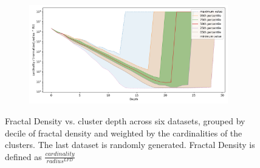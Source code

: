 \documentclass[review,supplement,onefignum,onetabnum]{siamonline220329}
\begin{document}
\begin{figure}[ht!]
\begin{subfigure}[b]{0.47\textwidth}
    \label{fig:results:silva-fractal_density}
    \end{subfigure}%
    \begin{subfigure}[b]{0.47\textwidth}
    \includegraphics[width=0.95\textwidth]{images/fractal_density/random-1000000.png}\\
    \label{fig:results:random-fractal_density}
    \end{subfigure}
    \vspace{1em}
    \caption{Fractal Density vs. cluster depth across six datasets, grouped by decile of fractal density and weighted by the cardinalities of the clusters.
    The last dataset is randomly generated.
    Fractal Density is defined as $\frac{cardinality}{radius^{LFD}}$}
    \label{fig:results:fractal_density-plots}
\end{figure}




\end{document}
